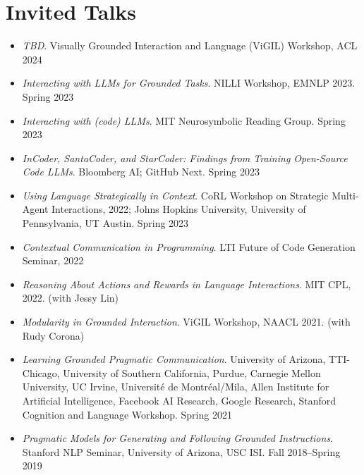 \documentclass[11pt]{article}
\begin{document}
\section*{Invited Talks}

\begin{itemize}
\item \emph{TBD}. Visually Grounded Interaction and Language (ViGIL) Workshop, ACL 2024
\item \emph{Interacting with LLMs for Grounded Tasks}. NILLI Workshop, EMNLP 2023. Spring 2023
\item \emph{Interacting with (code) LLMs}. MIT Neurosymbolic Reading Group. Spring 2023
\item \emph{InCoder, SantaCoder, and StarCoder: Findings from Training Open-Source Code LLMs}. Bloomberg AI; GitHub Next. Spring 2023
\item \emph{Using Language Strategically in Context}. CoRL Workshop on Strategic Multi-Agent Interactions, 2022; Johns Hopkins University, University of Pennsylvania, UT Austin. Spring 2023
\item \emph{Contextual Communication in Programming}. LTI Future of Code Generation Seminar, 2022
\item \emph{Reasoning About Actions and Rewards in Language Interactions}. MIT CPL, 2022. (with Jessy Lin)
\item \emph{Modularity in Grounded Interaction}. ViGIL Workshop, NAACL 2021. (with Rudy Corona)
\item \emph{Learning Grounded Pragmatic Communication}. University of Arizona, TTI-Chicago, University of Southern California, Purdue, Carnegie Mellon University, UC Irvine, Université de Montréal/Mila, Allen Institute for Artificial Intelligence, Facebook AI Research, Google Research, Stanford Cognition and Language Workshop. Spring 2021
\item \emph{Pragmatic Models for Generating and Following Grounded Instructions}. Stanford NLP Seminar, University of Arizona, USC ISI. Fall 2018--Spring 2019
\end{itemize}
\end{document}
